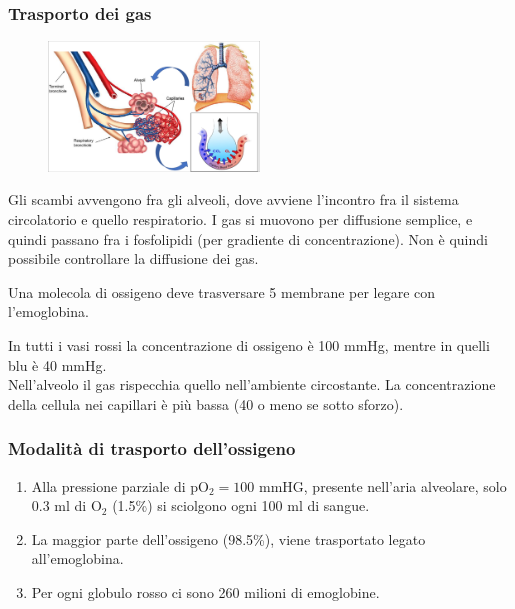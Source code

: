 \documentclass[a4paper]{article}
\begin{document}
\subsubsection{Trasporto dei gas}

\begin{figure}
    \includegraphics[width=0.5\textwidth]{./gas_transport.png}
    \vspace{-1cm}
\end{figure}

Gli scambi avvengono fra gli alveoli, dove avviene l'incontro fra il sistema
circolatorio e quello respiratorio.
I gas si muovono per diffusione semplice, e quindi passano fra i fosfolipidi (per gradiente di concentrazione).
Non è quindi possibile controllare la diffusione dei gas.

Una molecola di ossigeno deve trasversare 5 membrane per legare con l'emoglobina.

\wrapfill


In tutti i vasi rossi la concentrazione di ossigeno è 100 mmHg, mentre in quelli blu è 40 mmHg.
\\
Nell'alveolo il gas rispecchia quello nell'ambiente circostante.
La concentrazione della cellula nei capillari è più bassa (40 o meno se sotto sforzo).

\subsubsection{Modalità di trasporto dell'ossigeno}

\begin{enumerate}
    \item Alla pressione parziale di pO\({}_2=100\) mmHG, presente nell'aria alveolare,
    solo 0.3 ml di O\({}_2\) (1.5\%) si sciolgono ogni 100 ml di sangue.
    \item La maggior parte dell'ossigeno (98.5\%), viene trasportato legato all'emoglobina.
    \item Per ogni globulo rosso ci sono 260 milioni di emoglobine.
\end{enumerate}
\end{document}
